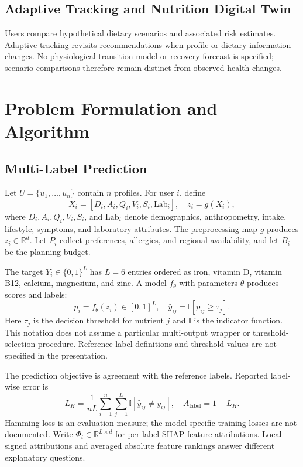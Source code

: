 \documentclass[conference]{IEEEtran}
\begin{document}
\subsection{Adaptive Tracking and Nutrition Digital Twin}
Users compare hypothetical dietary scenarios and associated risk estimates. Adaptive tracking revisits recommendations when profile or dietary information changes. No physiological transition model or recovery forecast is specified; scenario comparisons therefore remain distinct from observed health changes.

\section{Problem Formulation and Algorithm}

\subsection{Multi-Label Prediction}
Let $U = \{u_1, \dots, u_n\}$ contain $n$ profiles. For user $i$, define
\begin{equation}
X_i = [D_i, A_i, Q_i, V_i, S_i, \text{Lab}_i], \quad z_i = g(X_i),
\end{equation}
where $D_i, A_i, Q_i, V_i, S_i$, and $\text{Lab}_i$ denote demographics, anthropometry, intake, lifestyle, symptoms, and laboratory attributes. The preprocessing map $g$ produces $z_i \in \mathbb{R}^d$. Let $P_i$ collect preferences, allergies, and regional availability, and let $B_i$ be the planning budget.

The target $Y_i \in \{0, 1\}^L$ has $L = 6$ entries ordered as iron, vitamin D, vitamin B12, calcium, magnesium, and zinc. A model $f_\theta$ with parameters $\theta$ produces scores and labels:
\begin{equation}
p_i = f_\theta(z_i) \in [0, 1]^L, \quad \hat{y}_{ij} = \mathbb{I}[p_{ij} \ge \tau_j].
\end{equation}
Here $\tau_j$ is the decision threshold for nutrient $j$ and $\mathbb{I}$ is the indicator function. This notation does not assume a particular multi-output wrapper or threshold-selection procedure. Reference-label definitions and threshold values are not specified in the presentation.

The prediction objective is agreement with the reference labels. Reported label-wise error is
\begin{equation}
L_H = \frac{1}{nL} \sum_{i=1}^n \sum_{j=1}^L \mathbb{I}[\hat{y}_{ij} \neq y_{ij}], \quad A_{\text{label}} = 1 - L_H.
\end{equation}
Hamming loss is an evaluation measure; the model-specific training losses are not documented. Write $\Phi_i \in \mathbb{R}^{L \times d}$ for per-label SHAP feature attributions. Local signed attributions and averaged absolute feature rankings answer different explanatory questions.
\end{document}
